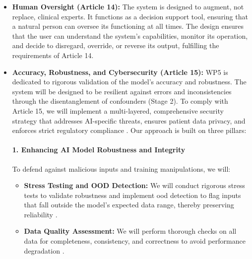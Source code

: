 \documentclass[11pt, a4paper]{article}
\begin{document}
\begin{itemize}
    \item \textbf{Human Oversight (Article 14):} The system is designed to augment, not replace, clinical experts. It functions as a decision support tool, ensuring that a natural person can oversee its functioning at all times. The design ensures that the user can understand the system's capabilities, monitor its operation, and decide to disregard, override, or reverse its output, fulfilling the requirements of Article 14.

    \item \textbf{Accuracy, Robustness, and Cybersecurity (Article 15):} WP5 is dedicated to rigorous validation of the model's accuracy and robustness. The system will be designed to be resilient against errors and inconsistencies through the disentanglement of confounders (Stage 2). To comply with Article 15, we will implement a multi-layered, comprehensive security strategy that addresses AI-specific threats, ensures patient data privacy, and enforces strict regulatory compliance \cite{AlAttar2023,AlkanZakariyya2025}. Our approach is built on three pillars:

\paragraph{1. Enhancing AI Model Robustness and Integrity}
To defend against malicious inputs and training manipulations, we will:
\begin{itemize}
    \item \textbf{Stress Testing and OOD Detection:} We will conduct rigorous stress tests to validate robustness and implement \gls{ood} detection to flag inputs that fall outside the model's expected data range, thereby preserving reliability \cite{KhadkaEpiphaniou2025}.
    \item \textbf{Data Quality Assessment:} We will perform thorough checks on all data for completeness, consistency, and correctness to avoid performance degradation \cite{GarcaGmezBlanesSelva2023}.
\end{itemize}


\end{itemize}
\end{document}
